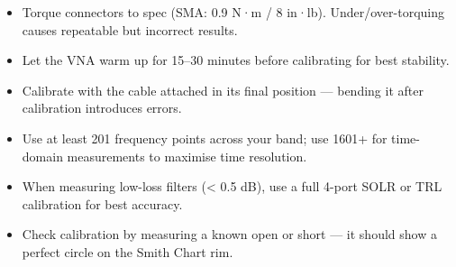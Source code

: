       
\begin{itemize}

        \item Torque connectors to spec (SMA: 0.9 N·m / 8 in·lb). Under/over-torquing causes repeatable but incorrect results.

        \item Let the VNA warm up for 15–30 minutes before calibrating for best stability.

        \item Calibrate with the cable attached in its final position — bending it after calibration introduces errors.

        \item Use at least 201 frequency points across your band; use 1601+ for time-domain measurements to maximise time resolution.

        \item When measuring low-loss filters (\textless{} 0.5 dB), use a full 4-port SOLR or TRL calibration for best accuracy.

        \item Check calibration by measuring a known open or short — it should show a perfect circle on the Smith Chart rim.

      
\end{itemize}



